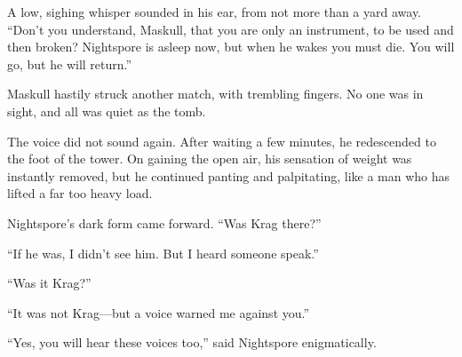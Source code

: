 A low, sighing whisper sounded in his ear, from not more than a yard away. ``Don't you understand, Maskull, that you are only an instrument, to be used and then broken? Nightspore is asleep now, but when he wakes you must die. You will go, but he will return.''

Maskull hastily struck another match, with trembling fingers. No one was in sight, and all was quiet as the tomb.

The voice did not sound again. After waiting a few minutes, he redescended to the foot of the tower. On gaining the open air, his sensation of weight was instantly removed, but he continued panting and palpitating, like a man who has lifted a far too heavy load.

Nightspore's dark form came forward. ``Was Krag there?''

``If he was, I didn't see him. But I heard someone speak.''

``Was it Krag?''

``It was not Krag—but a voice warned me against you.''

``Yes, you will hear these voices too,'' said Nightspore enigmatically.




\chapterend